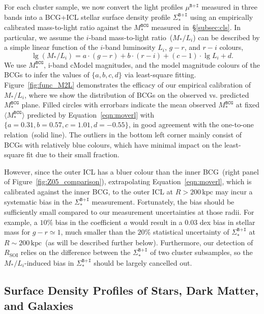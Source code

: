 \documentclass[fleqn,usenatbib]{mnras}
\newcommand{\rsoi}{R_{\mathrm{SOI}}}
\newcommand{\sigbi}{\Sigma_*^{\texttt{B+I}}}
\newcommand{\mubi}{\mu^{\texttt{B+I}}}
\newcommand{\msbcg}{M_*^{\texttt{BCG}}}
\newcommand{\kpc}{\mathrm{kpc}}
\begin{document}
For each cluster sample, we now convert the light profiles $\mubi$ measured
in three bands into a BCG+ICL stellar surface density profile $\sigbi$
using an empirically calibrated mass-to-light ratio against the $\msbcg$
measured in~\S\ref{subsec:cls}.  In particular, we assume the $i$-band
mass-to-light ratio~($M_*/L_i$) can be described by a simple linear
function of the $i$-band luminosity $L_i$, $g{-}r$, and $r{-}i$ colours,
\begin{equation}
    \lg(M_{\ast}/L_{i}) = a \cdot (g-r) + b \cdot (r-i) + (c - 1) \cdot \lg L_{i} + d.
    \label{eqn:moverl}
\end{equation}
We use $\msbcg$, i-band cModel magnitudes, and the model magnitude colours
of the BCGs to infer the values of $\{a, b, c, d\}$ via least-square
fitting. Figure~\ref{fig:func_M2L} demonstrates the efficacy of our
empirical calibration of $M_*/L_i$, where we show the distribution of BCGs
on the observed vs. predicted $\msbcg$ plane. Filled circles with errorbars
indicate the mean observed $\msbcg$ at fixed $\langle\msbcg\rangle$
predicted by Equation~\ref{eqn:moverl} with $\{a{=}0.31, b{=}0.57,
c{=}1.01, d{=}{-}0.55\}$, in good agreement with the one-to-one
relation~(solid line). The outliers in the bottom left corner mainly
consist of BCGs with relatively blue colours, which have minimal impact on
the least-square fit due to their small fraction.


However, since the outer ICL has a bluer colour than the inner BCG~(right
panel of Figure~\ref{fig:Z05_comparison}), extrapolating
Equation~\ref{eqn:moverl}, which is calibrated against the inner BCG, to
the outer ICL at $R{>}200\,\kpc$ may incur a systematic bias in the
$\sigbi$ measurement.  Fortunately, the bias should be sufficiently small
compared to our measurement uncertainties at those radii. For example, a
$10\%$ bias in the coefficient $a$ would result in a $0.03$ dex bias in
stellar mass for $g{-}r{\simeq}1$, much smaller than the $20\%$ statistical
uncertainty of $\sigbi$ at $R{\sim}200\,\kpc$~(as will be described further
below). Furthermore, our detection of $\rsoi$ relies on the difference
between the $\sigbi$ of two cluster subsamples, so the $M_*/L_i$-induced
bias in $\sigbi$ should be largely cancelled out.



\subsection{Surface Density Profiles of Stars, Dark Matter, and Galaxies}
\label{subsec:sigmathree}
\end{document}
